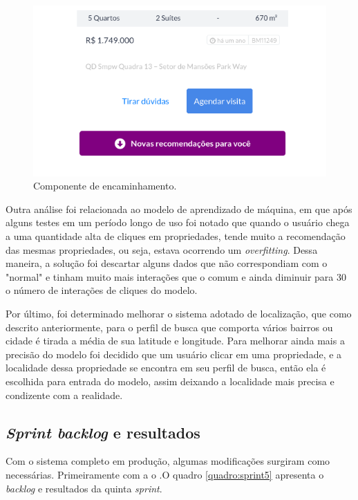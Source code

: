 \begin{figure}[H]
    \centering
    \includegraphics[scale=0.6]{figuras/desenvolvimento/componente_scroll.png}
    \caption[Componente de encaminhamento]{Componente de encaminhamento.}
    \label{fig:componente_scroll}
\end{figure}

Outra análise foi relacionada ao modelo de aprendizado de máquina, em que após alguns testes em um período longo de uso foi notado que quando o usuário chega a uma quantidade alta de cliques em propriedades, tende muito a recomendação das mesmas propriedades, ou seja, estava ocorrendo um \textit{overfitting}. Dessa maneira, a solução foi descartar alguns dados que não correspondiam com o "normal" e tinham muito mais interações  que o comum e ainda diminuir para 30 o número de interações de cliques do modelo.

Por último, foi determinado melhorar o sistema adotado de localização, que como descrito anteriormente, para o perfil de busca que comporta vários bairros ou cidade é tirada a média de sua latitude e longitude. Para melhorar ainda mais a precisão do modelo foi decidido que um usuário clicar em uma propriedade, e a localidade dessa propriedade se encontra em seu perfil de busca, então ela é escolhida para entrada do modelo, assim deixando a localidade mais precisa e condizente com a realidade.

\subsection{\textit{Sprint backlog} e resultados}

Com o sistema completo em produção, algumas modificações surgiram como necessárias. Primeiramente com a o .O quadro \ref{quadro:sprint5} apresenta o \textit{backlog} e resultados da quinta  \textit{sprint}.

